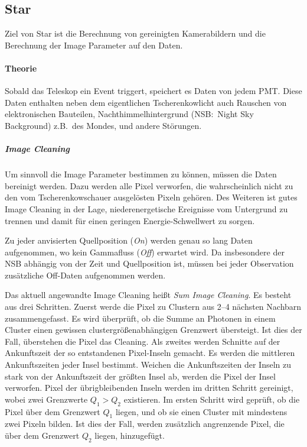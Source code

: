 \subsection{Star}%
\label{sub:star}
Ziel von Star ist die Berechnung von gereinigten Kamerabildern und die Berechnung
der Image Parameter auf den Daten.

\paragraph{Theorie}
Sobald das Teleskop ein Event triggert,
speichert es Daten von jedem PMT.\@
Diese Daten enthalten neben dem eigentlichen Tscherenkowlicht auch
Rauschen von elektronischen Bauteilen,
Nachthimmelhintergrund (NSB:\ Night Sky Background) z.B.\ des Mondes,
und andere Störungen.

\subparagraph{Image Cleaning}
Um sinnvoll die Image Parameter bestimmen zu können,
müssen die Daten bereinigt werden.
Dazu werden alle Pixel verworfen, die wahrscheinlich nicht zu den
vom Tscherenkowschauer ausgelösten Pixeln gehören.
Des Weiteren ist gutes Image Cleaning in der Lage,
niederenergetische Ereignisse vom Untergrund zu trennen und damit
für einen geringen Energie-Schwellwert zu sorgen.

Zu jeder anvisierten Quellposition (\textit{On}) werden
genau so lang Daten aufgenommen,
wo kein Gammafluss (\textit{Off}) erwartet wird.
Da insbesondere der NSB abhängig von der Zeit und Quellposition ist,
müssen bei jeder Observation zusätzliche Off-Daten aufgenommen werden.

Das aktuell angewandte Image Cleaning heißt \textit{Sum Image Cleaning}.
Es besteht aus drei Schritten.
Zuerst werde die Pixel zu Clustern aus 2--4 nächsten Nachbarn zusammengefasst.
Es wird überprüft, ob die Summe an Photonen in einem Cluster
einen gewissen clustergrößenabhängigen Grenzwert übersteigt.
Ist dies der Fall, überstehen die Pixel das Cleaning.
Als zweites werden Schnitte auf der Ankunftszeit der so entstandenen
Pixel-Inseln gemacht.
Es werden die mittleren Ankunftszeiten jeder Insel bestimmt.
Weichen die Ankunftszeiten der Inseln zu stark von der Ankunftszeit der größten Insel ab,
werden die Pixel der Insel verworfen.
Pixel der übrigbleibenden Inseln werden im dritten Schritt gereinigt,
wobei zwei Grenzwerte $Q_{1} > Q_{2}$ existieren.
Im ersten Schritt wird geprüft,
ob die Pixel über dem
Grenzwert $Q_{1}$ liegen,
und ob sie einen Cluster mit mindestens zwei Pixeln bilden.
Ist dies der Fall,
werden zusätzlich angrenzende Pixel,
die über dem Grenzwert $Q_{2}$ liegen,
hinzugefügt.

